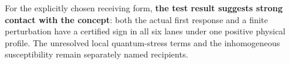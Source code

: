 For the explicitly chosen receiving form, \textbf{the test result suggests
strong contact with the concept}: both the actual first response and a
finite perturbation have a certified sign in all six lanes under one
positive physical profile. The unresolved local quantum-stress terms and
the inhomogeneous susceptibility remain separately named recipients.

